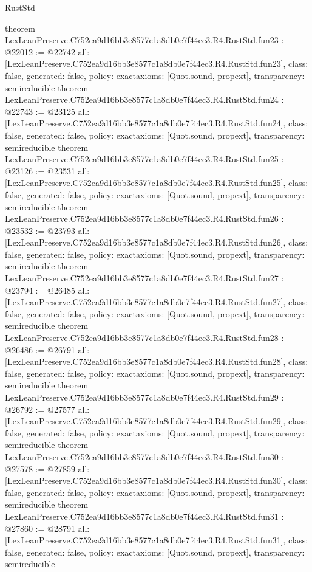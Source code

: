 \begin{lexlean}{RustStd}
\begin{coremodule}
{}
theorem LexLeanPreserve.C752ea9d16bb3e8577c1a8db0e7f44ec3.R4.RustStd.fun23 : @22012 := @22742 {
  all: [LexLeanPreserve.C752ea9d16bb3e8577c1a8db0e7f44ec3.R4.RustStd.fun23],
  class: false,
  generated: false,
  policy: exact{axioms: [Quot.sound, propext]},
  transparency: semireducible
}
theorem LexLeanPreserve.C752ea9d16bb3e8577c1a8db0e7f44ec3.R4.RustStd.fun24 : @22743 := @23125 {
  all: [LexLeanPreserve.C752ea9d16bb3e8577c1a8db0e7f44ec3.R4.RustStd.fun24],
  class: false,
  generated: false,
  policy: exact{axioms: [Quot.sound, propext]},
  transparency: semireducible
}
theorem LexLeanPreserve.C752ea9d16bb3e8577c1a8db0e7f44ec3.R4.RustStd.fun25 : @23126 := @23531 {
  all: [LexLeanPreserve.C752ea9d16bb3e8577c1a8db0e7f44ec3.R4.RustStd.fun25],
  class: false,
  generated: false,
  policy: exact{axioms: [Quot.sound, propext]},
  transparency: semireducible
}
theorem LexLeanPreserve.C752ea9d16bb3e8577c1a8db0e7f44ec3.R4.RustStd.fun26 : @23532 := @23793 {
  all: [LexLeanPreserve.C752ea9d16bb3e8577c1a8db0e7f44ec3.R4.RustStd.fun26],
  class: false,
  generated: false,
  policy: exact{axioms: [Quot.sound, propext]},
  transparency: semireducible
}
theorem LexLeanPreserve.C752ea9d16bb3e8577c1a8db0e7f44ec3.R4.RustStd.fun27 : @23794 := @26485 {
  all: [LexLeanPreserve.C752ea9d16bb3e8577c1a8db0e7f44ec3.R4.RustStd.fun27],
  class: false,
  generated: false,
  policy: exact{axioms: [Quot.sound, propext]},
  transparency: semireducible
}
theorem LexLeanPreserve.C752ea9d16bb3e8577c1a8db0e7f44ec3.R4.RustStd.fun28 : @26486 := @26791 {
  all: [LexLeanPreserve.C752ea9d16bb3e8577c1a8db0e7f44ec3.R4.RustStd.fun28],
  class: false,
  generated: false,
  policy: exact{axioms: [Quot.sound, propext]},
  transparency: semireducible
}
theorem LexLeanPreserve.C752ea9d16bb3e8577c1a8db0e7f44ec3.R4.RustStd.fun29 : @26792 := @27577 {
  all: [LexLeanPreserve.C752ea9d16bb3e8577c1a8db0e7f44ec3.R4.RustStd.fun29],
  class: false,
  generated: false,
  policy: exact{axioms: [Quot.sound, propext]},
  transparency: semireducible
}
theorem LexLeanPreserve.C752ea9d16bb3e8577c1a8db0e7f44ec3.R4.RustStd.fun30 : @27578 := @27859 {
  all: [LexLeanPreserve.C752ea9d16bb3e8577c1a8db0e7f44ec3.R4.RustStd.fun30],
  class: false,
  generated: false,
  policy: exact{axioms: [Quot.sound, propext]},
  transparency: semireducible
}
theorem LexLeanPreserve.C752ea9d16bb3e8577c1a8db0e7f44ec3.R4.RustStd.fun31 : @27860 := @28791 {
  all: [LexLeanPreserve.C752ea9d16bb3e8577c1a8db0e7f44ec3.R4.RustStd.fun31],
  class: false,
  generated: false,
  policy: exact{axioms: [Quot.sound, propext]},
  transparency: semireducible
}
\end{coremodule}
\end{lexlean}
